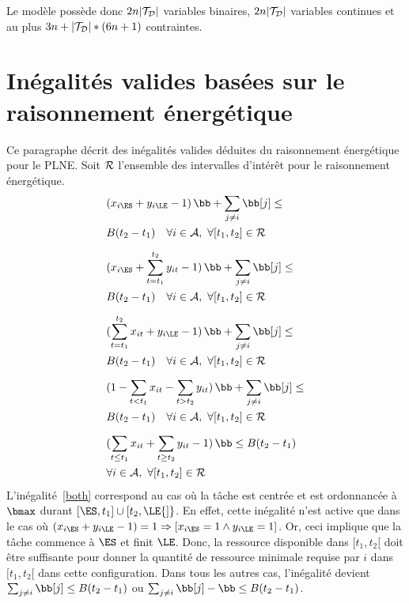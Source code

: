 Le modèle possède donc $2n|{\cal T}_{\cal D}|$ variables binaires,
$2n|{\cal T}_{\cal D}|$ variables continues et au plus $3n+|{\cal
T}_{\cal D}|*(6n+1)$ contraintes.

\section{Inégalités valides basées sur le raisonnement énergétique}
Ce paragraphe décrit des inégalités valides déduites du raisonnement
énergétique pour le PLNE. Soit ${\cal R}$ l'ensemble des intervalles
d'intérêt pour le raisonnement énergétique.
{\scriptsize
\begin{align}
&(x_{i\ES} + y_{i\LE} -1 ) \, \bb + \sum_{j\neq i}
  \bb[j] \le \nonumber\\ 
&  B(t_2-t_1) \quad \forall i \in {\cal A},\ \forall
  [t_1,t_2] \in {\cal R}
\label{both}\\[2mm] 
&(x_{i\ES} + \sum_{t=t_1}^{t_2}y_{it} -1) \, \bb + \sum_{j\neq i}
  \bb[j] \le \nonumber \\
&  B(t_2-t_1) \quad \forall i \in {\cal A},\ \forall
  [t_1,t_2] \in {\cal R}
\label{left}\\[2mm] 
&(\sum_{t=t_1}^{t_2}x_{it} + y_{i\LE}-1) \, \bb + \sum_{j\neq i}
  \bb[j] \le \nonumber\\
&  B(t_2-t_1) \quad \forall i \in {\cal A},\ \forall
  [t_1,t_2] \in {\cal R}
\label{right}\\[2mm] 
&(1-\sum_{t<t_1}x_{it} - \sum_{t>t_2}y_{it}) \, \bb + \sum_{j\neq i}
  \bb[j] \le \nonumber \\
&  B(t_2-t_1) \quad \forall i \in {\cal A},\ \forall
  [t_1,t_2] \in {\cal R}
\label{total}\\[2mm] 
&(\sum_{t\le t_1}x_{it} + \sum_{t\ge t_2}y_{it} -1 ) \, \bb  \le
B(t_2-t_1) \nonumber\\
&\forall i \in {\cal A},\ \forall
[t_1,t_2] \in {\cal R}
\label{min}
\end{align}
}
L'inégalité~\eqref{both} correspond au cas où la tâche est centrée et est
ordonnancée à $\bmax$ durant $[\ES,t_1] \cup
[t_2,\LE{]}$. En effet, cette inégalité n'est active que dans
le cas où $(x_{i\ES} + y_{i\LE} -1 )= 1 \Rightarrow
\left[x_{i\ES}=1\land y_{i\LE}=1\right]$. Or,
ceci implique que la tâche commence à $\ES$ et finit
$\LE$. Donc, la ressource disponible dans $[t_1,t_2[$ doit
être suffisante pour donner la quantité de ressource minimale requise
par $i$ dans $[t_1,t_2[$ dans cette configuration.  Dans tous les
autres cas, l'inégalité devient $\sum_{j\neq i} \bb[j] \le B(t_2-t_1)$
ou $\sum_{j\neq i} \bb[j] - \bb \le B(t_2-t_1)$.

